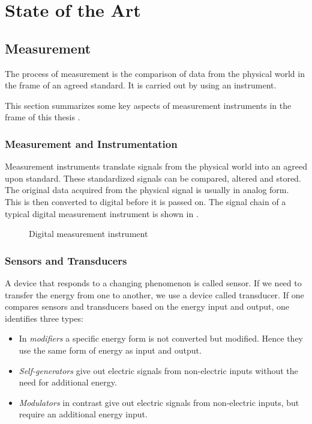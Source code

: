 \chapter{State of the Art}
\label{chap:\currfilebase}

\section{Measurement}
The process of measurement is the comparison of data from the physical world in the frame of an agreed standard. It is carried out by using an instrument.

This section summarizes some key aspects of measurement instruments in the frame of this thesis \cite{webster2018measurement}.

\subsection{Measurement and Instrumentation}

Measurement instruments translate signals from the physical world into an agreed upon standard. These standardized signals can be compared, altered and stored.
The original data acquired from the physical signal is usually in analog form. This is then converted to digital before it is passed on. The signal chain of a typical digital measurement instrument is shown in .

\cite{webster2018measurement}
\begin{figure}[!htb]
    \centering
    
    \caption[Digital instrument]{Digital measurement instrument}
    \label{fig:digital_instrument}
\end{figure}

\subsection{Sensors and Transducers}

A device that responds to a changing phenomenon is called sensor. If we need to transfer the energy from one to another, we use a device called transducer. If one compares sensors and transducers based on the energy input and output, one identifies three types:
\begin{itemize}
    \item In \emph{modifiers} a specific energy form is not converted but modified. Hence they use the same form of energy as input and output.
    \item \emph{Self-generators} give out electric signals from non-electric inputs without the need for additional energy.
    \item \emph{Modulators} in contrast give out electric signals from non-electric inputs, but require an additional energy input.
\end{itemize}

